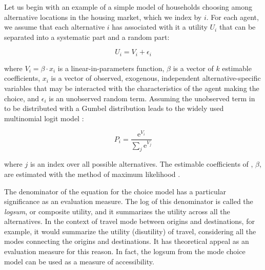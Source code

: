 Let us begin with an example of a simple model of households choosing among alternative locations in the housing market, which we index by $i$. For each agent, we assume that each alternative $i$ has associated with it a utility $U_i$ that can be separated into a systematic part and a random part:

\begin{equation}
    \label{eq:utility}
    U_i = V_i + \epsilon_i
\end{equation}

where $V_i = \beta\cdot {x}_i$ is a linear-in-parameters function, $\beta$ is a vector of $k$ estimable coefficients,
$x_i$ is a vector of observed, exogenous, independent alternative-specific variables that may be interacted with the
characteristics of the agent making the choice, and $\epsilon_i$ is an unobserved random term. Assuming the unobserved term in  to be distributed with a Gumbel distribution leads to the widely used multinomial logit model \citep{mcfadden-1974,mcfadden-1981}:

\begin{equation}
    \label{eq:mnl}
    P_i = \frac{\mathrm{e}^{V_i}}{\sum_j \mathrm{e}^{V_j}}
\end{equation}

where $j$ is an index over all possible alternatives. The estimable coefficients of , $\beta$, are estimated with the method of maximum likelihood \citep{greene-2002}.

The denominator of the equation for the choice model has a particular significance as an evaluation measure. The log of this denominator is called the \emph{logsum}, or composite utility, and it summarizes the utility across all the alternatives. In the context of travel mode between origins and destinations, for example, it would summarize the utility (disutility) of travel, considering all the modes connecting the origins and destinations. It has theoretical appeal as an evaluation measure for this reason. In fact, the logsum from the mode choice model can be used as a measure of accessibility.

